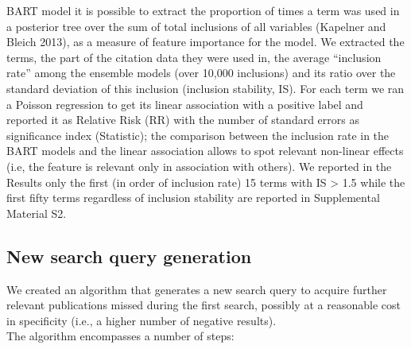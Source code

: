 \documentclass{article}
\begin{document}
BART model it is possible to extract the proportion of times a term was
used in a posterior tree over the sum of total inclusions of all
variables (Kapelner and Bleich 2013), as a measure of feature importance
for the model. We extracted the terms, the part of the citation data
they were used in, the average ``inclusion rate'' among the ensemble
models (over 10,000 inclusions) and its ratio over the standard
deviation of this inclusion (inclusion stability, IS). For each term we
ran a Poisson regression to get its linear association with a positive
label and reported it as Relative Risk (RR) with the number of standard
errors as significance index (Statistic); the comparison between the
inclusion rate in the BART models and the linear association allows to
spot relevant non-linear effects (i.e, the feature is relevant only in
association with others). We reported in the Results only the first (in
order of inclusion rate) 15 terms with IS \textgreater{} 1.5 while the
first fifty terms regardless of inclusion stability are reported in
Supplemental Material S2.

\hypertarget{new-search-query-generation}{%
\subsection{New search query
generation}\label{new-search-query-generation}}

We created an algorithm that generates a new search query to acquire
further relevant publications missed during the first search, possibly
at a reasonable cost in specificity (i.e., a higher number of negative
results).\\
The algorithm encompasses a number of steps:
\end{document}
